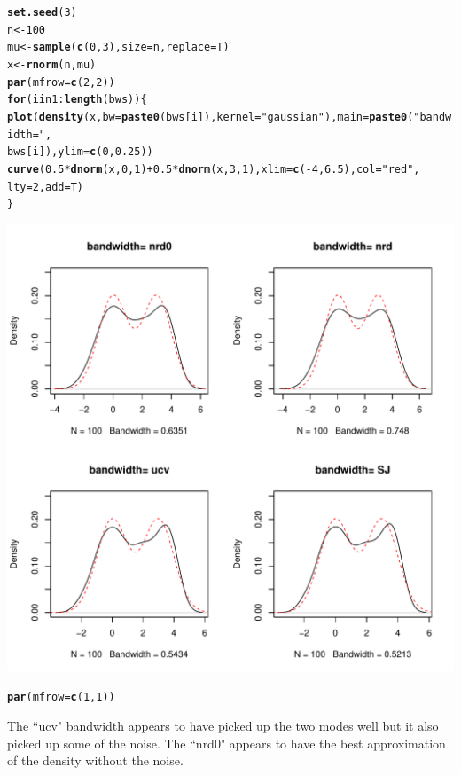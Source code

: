 \documentclass{article}\usepackage[]{graphicx}\usepackage[]{color}
\makeatletter
\def\maxwidth{ %
  \ifdim\Gin@nat@width>\linewidth
    \linewidth
  \else
    \Gin@nat@width
  \fi
}
\newcommand{\hlstr}[1]{\textcolor[rgb]{0.192,0.494,0.8}{#1}}%
\newcommand{\hlkwd}[1]{\textcolor[rgb]{0.737,0.353,0.396}{\textbf{#1}}}%
\newenvironment{kframe}{%
 \def\at@end@of@kframe{}%
 \ifinner\ifhmode%
  \def\at@end@of@kframe{\end{minipage}}%
  \begin{minipage}{\columnwidth}%
 \fi\fi%
 \def\FrameCommand##1{\hskip\@totalleftmargin \hskip-\fboxsep
 \colorbox{shadecolor}{##1}\hskip-\fboxsep
     \hskip-\linewidth \hskip-\@totalleftmargin \hskip\columnwidth}%
 \MakeFramed {\advance\hsize-\width
   \@totalleftmargin\z@ \linewidth\hsize
   \@setminipage}}%
 {\par\unskip\endMakeFramed%
 \at@end@of@kframe}
\newenvironment{knitrout}{}{} %
\makeatother
\begin{document}
\begin{itemize}
\begin{knitrout}
\color{fgcolor}\begin{kframe}
\begin{alltt}
\hlkwd{set.seed}(3)
n <- 100
mu <- \hlkwd{sample}(\hlkwd{c}(0, 3), size = n, replace = T)
x <- \hlkwd{rnorm}(n, mu)
\hlkwd{par}(mfrow = \hlkwd{c}(2, 2))
\hlkwd{for} (i in 1:\hlkwd{length}(bws)) \{
    \hlkwd{plot}(\hlkwd{density}(x, bw = \hlkwd{paste0}(bws[i]), kernel = \hlstr{"gaussian"}), main = \hlkwd{paste0}(\hlstr{"bandwidth= "}, 
        bws[i]), ylim = \hlkwd{c}(0, 0.25))
    \hlkwd{curve}(0.5 * \hlkwd{dnorm}(x, 0, 1) + 0.5 * \hlkwd{dnorm}(x, 3, 1), xlim = \hlkwd{c}(-4, 6.5), col = \hlstr{"red"}, 
        lty = 2, add = T)
\}
\end{alltt}
\end{kframe}
\includegraphics[width=\maxwidth]{figure/ten9} 
\begin{kframe}\begin{alltt}
\hlkwd{par}(mfrow = \hlkwd{c}(1, 1))
\end{alltt}
\end{kframe}
\end{knitrout}

The ``ucv" bandwidth appears to have picked up the two modes well but it also picked up some of the noise.  The ``nrd0" appears to have the best approximation of the density without the noise.\\


\end{itemize}
\end{document}
